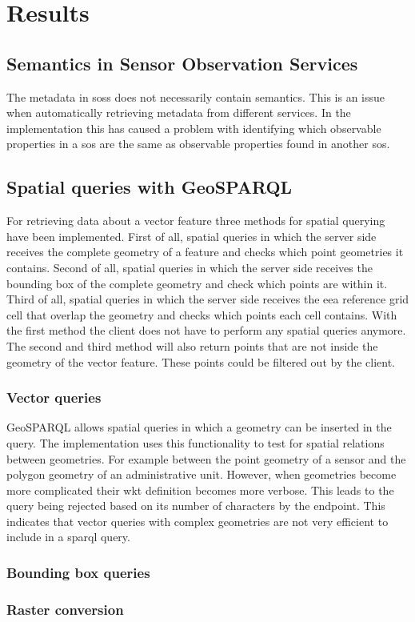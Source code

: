 
\chapter{Results}
\label{chap:results}

\section{Semantics in Sensor Observation Services}
The metadata in \aclp{sos} does not necessarily contain semantics. This is an issue when automatically retrieving metadata from different services. In the implementation this has caused a problem with identifying which observable properties in a \ac{sos} are the same as observable properties found in another \ac{sos}. 


\section{Spatial queries with GeoSPARQL}
\label{par:spQueries}
For retrieving data about a vector feature three methods for spatial querying have been implemented. First of all, spatial queries in which the server side receives the complete geometry of a feature and checks which point geometries it contains. Second of all, spatial queries in which the server side receives the bounding box of the complete geometry and check which points are within it. Third of all, spatial queries in which the server side receives the \ac{eea} reference grid cell that overlap the geometry and checks which points each cell contains. With the first method the client does not have to perform any spatial queries anymore. The second and third method will also return points that are not inside the geometry of the vector feature. These points could be filtered out by the client. 

\subsection{Vector queries}
GeoSPARQL allows spatial queries in which a geometry can be inserted in the query. The implementation uses this functionality to test for spatial relations between geometries. For example between the point geometry of a sensor and the polygon geometry of an administrative unit. However, when geometries become more complicated their \ac{wkt} definition becomes more verbose. This leads to the query being rejected based on its number of characters by the endpoint. This indicates that vector queries with complex geometries are not very efficient to include in a \ac{sparql} query.     

\subsection{Bounding box queries}


\subsection{Raster conversion}